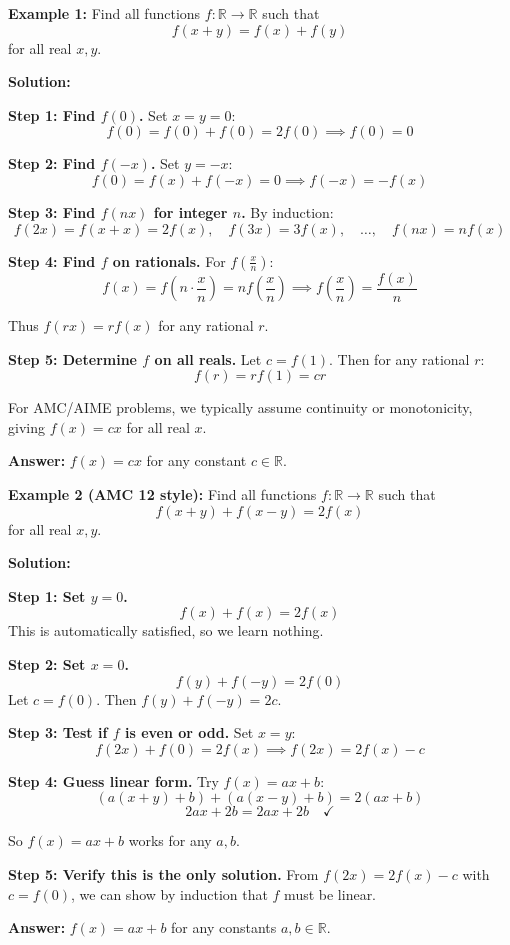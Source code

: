 \documentclass[12pt]{extarticle}
\begin{document}
\begin{examplebox}
\textbf{Example 1:} Find all functions $f: \mathbb{R} \to \mathbb{R}$ such that
\[
f(x+y) = f(x) + f(y)
\]
for all real $x, y$.

\textbf{Solution:}

\textbf{Step 1: Find $f(0)$.} Set $x=y=0$:
\[
f(0) = f(0) + f(0) = 2f(0) \implies f(0) = 0
\]

\textbf{Step 2: Find $f(-x)$.} Set $y=-x$:
\[
f(0) = f(x) + f(-x) = 0 \implies f(-x) = -f(x)
\]

\textbf{Step 3: Find $f(nx)$ for integer $n$.} By induction:
\[
f(2x) = f(x+x) = 2f(x), \quad f(3x) = 3f(x), \quad \ldots, \quad f(nx) = nf(x)
\]

\textbf{Step 4: Find $f$ on rationals.} For $f(\frac{x}{n})$:
\[
f(x) = f\left(n \cdot \frac{x}{n}\right) = nf\left(\frac{x}{n}\right) \implies f\left(\frac{x}{n}\right) = \frac{f(x)}{n}
\]

Thus $f(rx) = rf(x)$ for any rational $r$.

\textbf{Step 5: Determine $f$ on all reals.} Let $c = f(1)$. Then for any rational $r$:
\[
f(r) = rf(1) = cr
\]

For AMC/AIME problems, we typically assume continuity or monotonicity, giving $f(x) = cx$ for all real $x$.

\textbf{Answer:} $\boxed{f(x) = cx}$ for any constant $c \in \mathbb{R}$.
\end{examplebox}

\begin{examplebox}
\textbf{Example 2 (AMC 12 style):} Find all functions $f: \mathbb{R} \to \mathbb{R}$ such that
\[
f(x+y) + f(x-y) = 2f(x)
\]
for all real $x, y$.

\textbf{Solution:}

\textbf{Step 1: Set $y=0$.}
\[
f(x) + f(x) = 2f(x)
\]
This is automatically satisfied, so we learn nothing.

\textbf{Step 2: Set $x=0$.}
\[
f(y) + f(-y) = 2f(0)
\]
Let $c = f(0)$. Then $f(y) + f(-y) = 2c$.

\textbf{Step 3: Test if $f$ is even or odd.} Set $x=y$:
\[
f(2x) + f(0) = 2f(x) \implies f(2x) = 2f(x) - c
\]

\textbf{Step 4: Guess linear form.} Try $f(x) = ax + b$:
\[
(a(x+y)+b) + (a(x-y)+b) = 2(ax+b)
\]
\[
2ax + 2b = 2ax + 2b \quad \checkmark
\]

So $f(x) = ax + b$ works for any $a, b$.

\textbf{Step 5: Verify this is the only solution.} From $f(2x) = 2f(x) - c$ with $c=f(0)$, we can show by induction that $f$ must be linear.

\textbf{Answer:} $\boxed{f(x) = ax + b}$ for any constants $a, b \in \mathbb{R}$.
\end{examplebox}
\end{document}
